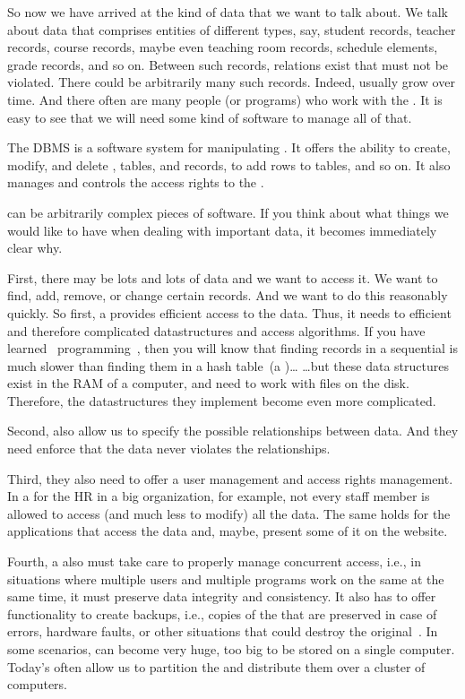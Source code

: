 So now we have arrived at the kind of data that we want to talk about.
We talk about data that comprises entities of different types, say, student records, teacher records, course records, maybe even teaching room records, schedule elements, grade records, and so on.
Between such records, relations exist that must not be violated.
There could be arbitrarily many such records.
Indeed,  usually grow over time.
And there often are many people (or programs) who work with the .
It is easy to see that we will need some kind of software to manage all of that.%
%
\begin{definition}%
The \acrfull{DBMS} is a software system for manipulating . %
It offers the ability to create, modify, and delete , tables, and records, to add rows to tables, and so on.
It also manages and controls the access rights to the .%
\end{definition}%
%
 can be arbitrarily complex pieces of software.
If you think about what things we would like to have when dealing with important data, it becomes immediately clear why.

First, there may be lots and lots of data and we want to access it.
We want to find, add, remove, or change certain records.
And we want to do this reasonably quickly.
So first, a  provides efficient access to the data.
Thus, it needs to efficient and therefore complicated datastructures and access algorithms.
If you have learned \python\ programming~\cite{programmingWithPython}, then you will know that finding records in a sequential  is much slower than finding them in a hash table~(a )\dots
{\dots}but these data structures exist in the RAM of a computer, and  need to work with files on the disk.
Therefore, the datastructures they implement become even more complicated.

Second,  also allow us to specify the possible relationships between data.
And they need enforce that the data never violates the relationships.

Third, they also need to offer a user management and access rights management.
In a  for the \acrfull{HR} in a big organization, for example, not every  staff member is allowed to access (and much less to modify) all the data.
The same holds for the applications that access the data and, maybe, present some of it on the website.

Fourth, a  also must take care to properly manage concurrent access, i.e., in situations where multiple users and multiple programs work on the same  at the same time, it must preserve data integrity and consistency.
It also has to offer functionality to create backups, i.e., copies of the  that are preserved in case of errors, hardware faults, or other situations that could destroy the original~.
In some scenarios,  can become very huge, too big to be stored on a single computer.
Today's  often allow us to partition the  and distribute them over a cluster of computers.

